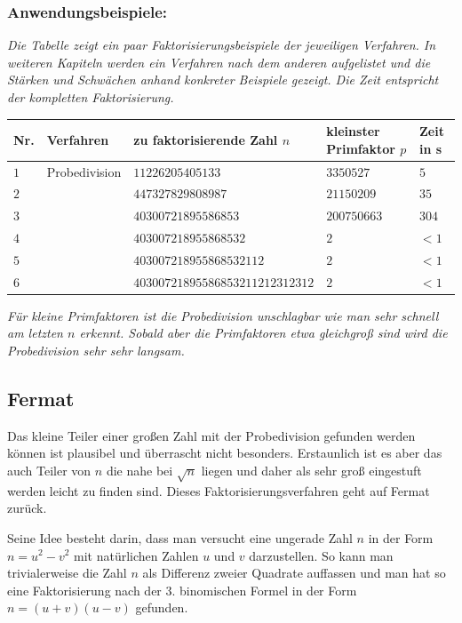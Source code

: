 \documentclass[10pt, bigheadings]{scrartcl}
\begin{document}
\subsubsection*{Anwendungsbeispiele:}
{\it
Die Tabelle zeigt ein paar Faktorisierungsbeispiele der jeweiligen Verfahren. In weiteren
Kapiteln werden ein Verfahren nach dem anderen aufgelistet und die Stärken und Schwächen
anhand konkreter Beispiele gezeigt. Die Zeit entspricht der kompletten Faktorisierung.
}
\begin{center}
\begin{tabular}{|l|l|l|l|l|}
\hline
Nr. & Verfahren & zu faktorisierende Zahl $n$ & kleinster Primfaktor $p$ & Zeit in s\\
\hline
$1$& Probedivision & $11226205405133$ & $3350527$ & $5$\\
$2$&	& $447327829808987$ & $21150209$ & $35$\\
$3$&	& $40300721895586853$  & $200750663$ & $304$\\
$4$&	& $403007218955868532$ & $2$ & $<1$\\
$5$&	& $403007218955868532112$ & $2$ & $<1$\\
$6$&	& $40300721895586853211212312312$ & $2$ & $<1$\\
\hline
\end{tabular}
\end{center}
{\it
Für kleine Primfaktoren ist die Probedivision unschlagbar wie man sehr
schnell am letzten $n$ erkennt. Sobald aber die Primfaktoren
etwa gleichgroß sind wird die Probedivision sehr sehr langsam.
}
\subsection{Fermat}
Das kleine Teiler einer großen Zahl mit der Probedivision gefunden werden können
ist plausibel und überrascht nicht besonders. Erstaunlich ist es aber das auch
Teiler von $n$ die nahe bei $\sqrt{n}$ liegen und daher als sehr groß eingestuft
werden leicht zu finden sind. Dieses Faktorisierungsverfahren geht auf Fermat zurück.

Seine Idee besteht darin, dass man versucht eine ungerade Zahl $n$ in der Form
$n=u^2 - v^2$ mit natürlichen Zahlen $u$ und $v$ darzustellen. So kann man
trivialerweise die Zahl $n$ als Differenz zweier Quadrate auffassen und man hat
so eine Faktorisierung nach der 3. binomischen Formel in der Form $n=(u+v)(u-v)$
gefunden.
\end{document}
